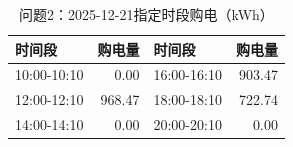 \begin{table}[H]\centering\small\caption{问题2：2025-12-21指定时段购电（kWh）}\label{tab:q220251221p}
\begin{tabular}{lrlr}\toprule
时间段 & 购电量 & 时间段 & 购电量\\\midrule
10:00-10:10 & 0.00 & 16:00-16:10 & 903.47\\
12:00-12:10 & 968.47 & 18:00-18:10 & 722.74\\
14:00-14:10 & 0.00 & 20:00-20:10 & 0.00\\
\bottomrule\end{tabular}\end{table}
